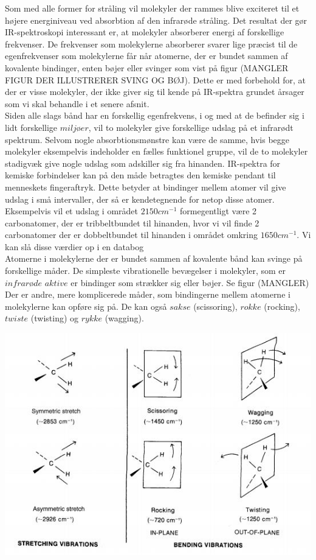 Som med alle former for stråling vil molekyler der rammes blive exciteret til et højere energiniveau ved absorbtion af den infrarøde stråling. Det resultat der gør IR-spektroskopi interessant er, at molekyler absorberer energi af forskellige frekvenser. De frekvenser som molekylerne absorberer svarer lige præcist til de egenfrekvenser som molekylerne får når atomerne, der er bundet sammen af  kovalente bindinger, enten bøjer eller svinger som vist på figur (MANGLER FIGUR DER ILLUSTRERER SVING OG BØJ). Dette er med forbehold for, at der er visse molekyler, der ikke giver sig til kende på IR-spektra grundet årsager som vi skal behandle i et senere afsnit. 
\\
Siden alle slags bånd har en forskellig egenfrekvens, i og med at de befinder sig i lidt forskellige $miljøer$, vil to molekyler give forskellige udslag på et infrarødt spektrum. Selvom nogle absorbtionsmønstre kan være de samme, hvis begge molekyler eksempelvis indeholder en fælles funktionel gruppe, vil de to molekyler stadigvæk give nogle udslag som adskiller sig fra hinanden. IR-spektra for kemiske forbindelser kan på den måde betragtes den kemiske pendant til menneskets fingeraftryk. Dette betyder at bindinger mellem atomer vil give udslag i små intervaller, der så er kendetegnende for netop disse atomer. Eksempelvis vil et udslag i området $2150cm^{-1}$ formegentligt være 2 carbonatomer, der er tribbeltbundet til hinanden, hvor vi vil finde 2 carbonatomer der er dobbeltbundet til hinanden i området omkring $1650cm^{-1}$. Vi kan slå disse værdier op i en databog
\\
Atomerne i molekylerne der er bundet sammen af kovalente bånd kan svinge på forskellige måder. De simpleste vibrationelle bevægelser i molekyler, som er $infrarøde$ $aktive$ er bindinger som strækker sig eller bøjer. Se figur (MANGLER)
\\
Der er andre, mere komplicerede måder, som bindingerne mellem atomerne i molekylerne kan opføre sig på. De kan også $sakse$ (scissoring), $rokke$ (rocking), $twiste$ (twisting) og $rykke$ (wagging). 
\\
\begin{center}
\includegraphics[scale=1]{Billeder/streak}
\end{center}
 
